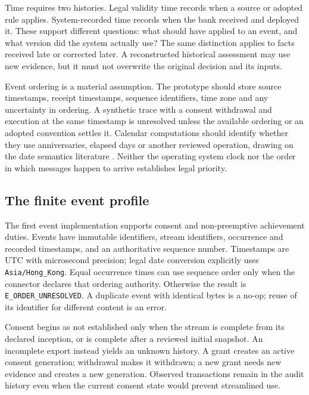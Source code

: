 \documentclass[12pt,a4paper,oneside,openany]{book}
\begin{document}
Time requires two histories. Legal validity time records when a source or adopted
rule applies. System-recorded time records when the bank received and deployed
it. These support different questions: what should have applied to an event, and
what version did the system actually use? The same distinction applies to facts
received late or corrected later. A reconstructed historical assessment may use
new evidence, but it must not overwrite the original decision and its inputs.

Event ordering is a material assumption. The prototype should store source
timestamps, receipt timestamps, sequence identifiers, time zone and any uncertainty
in ordering. A synthetic trace with a consent withdrawal and execution at the
same timestamp is unresolved unless the available ordering or an adopted
convention settles it. Calendar computations should identify whether they use
anniversaries, elapsed days or another reviewed operation, drawing on the date
semantics literature \citep{dates2024}. Neither the operating system clock nor the
order in which messages happen to arrive establishes legal priority.

\subsection{The finite event profile}
\label{merge:P-03b-event-contract:00}


The first event implementation supports consent and non-preemptive achievement
duties. Events have immutable identifiers, stream identifiers, occurrence and
recorded timestamps, and an authoritative sequence number. Timestamps are UTC
with microsecond precision; legal date conversion explicitly uses
\texttt{Asia/Hong\_Kong}. Equal occurrence times can use sequence order only
when the connector declares that ordering authority. Otherwise the result is
\texttt{E\_ORDER\_UNRESOLVED}. A duplicate event with identical bytes is a
no-op; reuse of its identifier for different content is an error.

Consent begins as not established only when the stream is complete from its
declared inception, or is complete after a reviewed initial snapshot. An incomplete export
instead yields an unknown history. A grant creates an active consent generation;
withdrawal makes it withdrawn; a new grant needs new evidence and creates a new
generation. Observed transactions remain in the audit history even when the
current consent state would prevent streamlined use.
\end{document}
